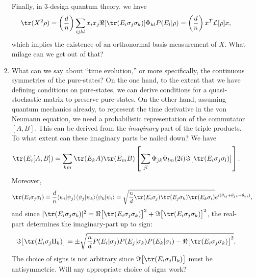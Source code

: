 \documentclass[11pt]{article}
\begin{document}
\begin{enumerate}
Finally, in 3-design quantum theory, we have
\begin{align}
	\tr(X^2\rho) &= \left(\frac{d}{n}\right)\sum_{ijkl} x_ix_j\Re[\tr(E_i\sigma_j\sigma_k)]\Phi_{kl}P(E_l|\rho)=\left(\frac{d}{n}\right)x^T\mathcal{L}[\rho]x,
\end{align}
which implies the existence of an orthonormal basis measurement of $X$. What milage can we get out of that?
\item What can we say about ``time evolution,'' or more specifically, the continuous symmetries of the pure-states? On the one hand, to the extent that we have defining conditions on pure-states, we can derive conditions for a quasi-stochastic matrix to preserve pure-states. On the other hand, assuming quantum mechanics already, to represent the time derivative in the von Neumann equation, we need a probabilistic representation of the commutator $[A, B]$. This can be derived from the \emph{imaginary} part of the triple products. To what extent can these imaginary parts be nailed down? We have
\begin{align}
\tr(E_i [A, B]) &= \sum_{km} \tr(E_k A)\tr(E_m B)\left[\sum_{jl}\Phi_{jk}\Phi_{lm}(2i)\Im\big[\tr(E_i\sigma_j\sigma_l)\big]\right].
\end{align}
Moreover,
\begin{align}
\tr(E_i\sigma_j \sigma_l) &= \frac{d}{n}\langle \psi_i|\psi_j\rangle\langle \psi_j|\psi_k\rangle\langle \psi_k|\psi_i\rangle=\sqrt{\frac{n}{d}\tr(E_i\sigma_j)\tr(E_j\sigma_k)\tr(E_k\sigma_i)}e^{i(\theta_{ij} + \theta_{jk}+\theta_{ki})},	
\end{align}
and since $|\tr(E_i\sigma_j\sigma_k)|^2= \Re\big[\tr(E_i\sigma_j\sigma_k)\big]^2+\Im\big[\tr(E_i\sigma_j\sigma_k)\big]^2$,
the real-part determines the imaginary-part up to sign:
\begin{align}
	\Im\big[\tr(E_i\sigma_j\Pi_k)\big] &= \pm\sqrt{\frac{n}{d}P(E_i|\sigma_j)P(E_j|\sigma_k)P(E_k|\sigma_i)-\Re\big[\tr(E_i\sigma_j\sigma_k)\big]^2}.
\end{align}
The choice of signs is not arbitrary since $\Im\big[\tr(E_i\sigma_j\Pi_k)\big]$ must be antisymmetric. Will any appropriate choice of signs work?
\end{enumerate}

\section{}
\end{document}
